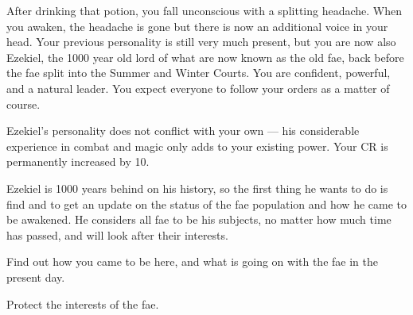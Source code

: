 \documentclass[char]{guildcamp2}
\begin{document}
\name{\cEzekiel{}}

After drinking that potion, you fall unconscious with a splitting headache. When you awaken, the headache is gone but there is now an additional voice in your head. Your previous personality is still very much present, but you are now also Ezekiel, the 1000 year old lord of what are now known as the old fae, back before the fae split into the Summer and Winter Courts. You are confident, powerful, and a natural leader. You expect everyone to follow your orders as a matter of course.

Ezekiel's personality does not conflict with your own --- his considerable experience in combat and magic only adds to your existing power. Your CR is permanently increased by 10.

Ezekiel is 1000 years behind on his history, so the first thing he wants to do is find \cTreeFae{} and \cBabyFae{} to get an update on the status of the fae population and how he came to be awakened. He considers all fae to be his subjects, no matter how much time has passed, and will look after their interests.

\begin{itemz}[Goals]
  \item Find out how you came to be here, and what is going on with the fae in the present day.
  \item Protect the interests of the fae.
\end{itemz}
\end{document}
